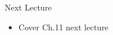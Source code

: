 \documentclass[aspectratio=1610]{beamer}
\begin{document}

%			
%			

\begin{frame}[wide]{Next Lecture}
	\begin{itemize}
		\item Cover Ch.11 next lecture
	\end{itemize}
\end{frame}
\end{document}
